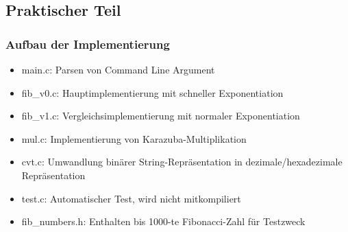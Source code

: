 \documentclass[course=erap]{aspdoc}
\begin{document}
\subsection{Praktischer Teil}
\subsubsection{Aufbau der Implementierung}
\begin{itemize}
    \itemsep0em
    \item main.c: Parsen von Command Line Argument
    \item fib\_v0.c: Hauptimplementierung mit schneller Exponentiation
    \item fib\_v1.c: Vergleichsimplementierung mit normaler Exponentiation
    \item mul.c: Implementierung von Karazuba-Multiplikation
    \item cvt.c: Umwandlung binärer String-Repräsentation in dezimale/hexadezimale Repräsentation
    \item test.c: Automatischer Test, wird nicht mitkompiliert
    \item fib\_numbers.h: Enthalten bis 1000-te Fibonacci-Zahl für Testzweck
\end{itemize}
\end{document}
